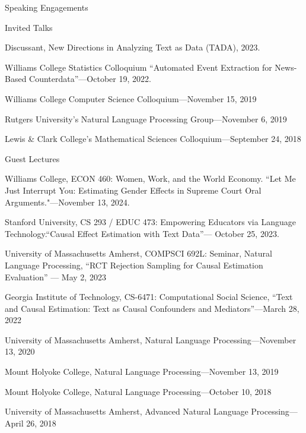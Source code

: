 \documentclass{resume} %
\begin{document}
\begin{rSection}{Speaking Engagements}
\begin{rSubsection}{Invited Talks}{}{}{}
\item Discussant, New Directions in Analyzing Text as Data (TADA), 2023. 
\item Williams College Statistics Colloquium ``Automated Event Extraction for
News-Based Counterdata''---October 19, 2022.
\item Williams College Computer Science Colloquium---November 15, 2019
\item Rutgers University's Natural Language Processing Group---November 6, 2019
\item Lewis \& Clark College's Mathematical Sciences Colloquium---September 24, 2018
\end{rSubsection}

\begin{rSubsection}{Guest Lectures}{}{}{}
\item Williams College, ECON 460: Women, Work, and the World Economy. ``Let Me Just Interrupt You: Estimating Gender Effects in Supreme Court Oral Arguments."---November 13, 2024.
\item Stanford University, CS 293 / EDUC 473: Empowering Educators via Language Technology.``Causal Effect Estimation with Text Data''--- October 25, 2023. 
\item University of Massachusetts Amherst, COMPSCI 692L: Seminar, Natural Language Processing, ``RCT Rejection Sampling for Causal Estimation Evaluation'' --- May 2, 2023
\item Georgia Institute of Technology, CS-6471: Computational Social Science, ``Text and Causal Estimation: Text as Causal Confounders and Mediators''---March 28, 2022
\item University of Massachusetts Amherst, Natural Language Processing---November 13, 2020 
\item Mount Holyoke College, Natural Language Processing---November 13, 2019
\item Mount Holyoke College, Natural Language Processing---October 10, 2018
\item University of Massachusetts Amherst, Advanced Natural Language Processing---April 26, 2018
\end{rSubsection}

\end{rSection}

\end{document}
